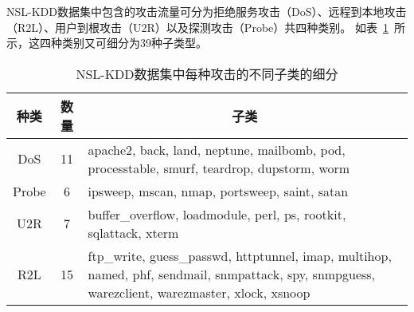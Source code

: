 NSL-KDD数据集中包含的攻击流量可分为拒绝服务攻击（DoS）、远程到本地攻击（R2L）、用户到根攻击（U2R）以及探测攻击（Probe）共四种类别。
如表~\ref{tab:attack_class}~所示，这四种类别又可细分为39种子类型。
\begin{table}[h]
	\caption{NSL-KDD数据集中每种攻击的不同子类的细分}
	\label{tab:attack_class}
	\begin{tabularx}{\textwidth}{@{}ccX@{}}
		\toprule
		\multicolumn{1}{c}{\textbf{种类}} & \multicolumn{1}{c}{\textbf{数量}} & \multicolumn{1}{c}{\textbf{子类}}                                                                                                                \\
		\midrule
		DoS                               & 11                                & apache2, back, land, neptune, mailbomb, pod, processtable, smurf, teardrop, dupstorm, worm                                                       \\
		Probe                             & 6                                 & ipsweep, mscan, nmap, portsweep, saint, satan                                                                                                    \\
		U2R                               & 7                                 & buffer\_overflow, loadmodule, perl, ps, rootkit, sqlattack, xterm                                                                                \\
		R2L                               & 15                                & ftp\_write, guess\_passwd, httptunnel, imap, multihop, named, phf, sendmail, snmpattack, spy, snmpguess, warezclient, warezmaster, xlock, xsnoop \\
		\bottomrule
	\end{tabularx}
\end{table}

